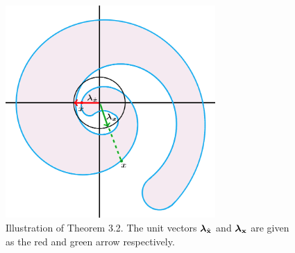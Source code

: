 \begin{figure}[h!]
\begin{center}
 	\includegraphics[width=8cm]{Figures/illustration.png}
\end{center}
\caption{Illustration of Theorem 3.2. The unit vectors $\boldsymbol{\lambda}_{\hat{\mathbf{x}}}$ and $\boldsymbol{\lambda}_{\mathbf{x}}$ are given as the red and green arrow respectively.}
\label{fig:illustration}
\end{figure}


